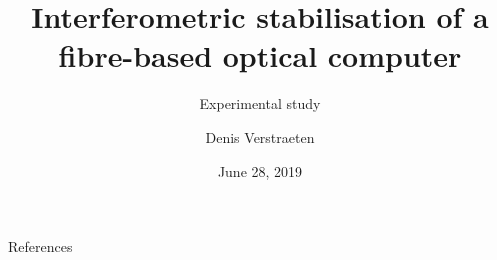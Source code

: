 




\title[Master Thesis]{Interferometric stabilisation of a fibre-based optical computer}
\subtitle{Experimental study}
\author{Denis Verstraeten}
\date{June 28, 2019}



	\begin{frame}[plain]
		\titlepage
	\end{frame}
	
	
	
	
	
	
	

	


	


	

	
	\begin{frame}{References}
		\printbibliography[heading=none]
	\end{frame}
	
